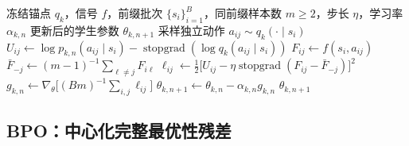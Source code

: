 \documentclass[lang=cn,scheme=chinese,openany]{elegantbook}
\newcommand{\sg}{\operatorname{stopgrad}}
\begin{document}
\begin{algorithm}[ht]
\caption{PMD-Mean 内层更新\\{\small\textit{数学语义：中心化奖励目标在概率归一化约束集上的投影}}}
\begin{algorithmic}[1]
\Require 冻结锚点 $q_k$，信号 $f$，前缀批次 $\{s_i\}_{i=1}^{B}$，同前缀样本数 $m\ge2$，步长 $\eta$，学习率 $\alpha_{k,n}$
\Ensure 更新后的学生参数 $\theta_{k,n+1}$
        \State 采样独立动作 $a_{ij}\sim q_k(\cdot\mid s_i)$
        \State $U_{ij}\gets\log p_{k,n}(a_{ij}\mid s_i)-\sg(\log q_k(a_{ij}\mid s_i))$
        \State $F_{ij}\gets f(s_i,a_{ij})$
    \EndFor
        \State $\bar F_{-j}\gets(m-1)^{-1}\sum_{\ell\ne j}F_{i\ell}$
        \State $\ell_{ij}\gets\frac12\bigl[U_{ij}-\eta\sg(F_{ij}-\bar F_{-j})\bigr]^2$
    \EndFor
\EndFor
\State $g_{k,n}\gets\nabla_\theta\bigl[(Bm)^{-1}\sum_{i,j}\ell_{ij}\bigr]$
\State $\theta_{k,n+1}\gets\theta_{k,n}-\alpha_{k,n}g_{k,n}$
\State \Return $\theta_{k,n+1}$
\end{algorithmic}
\end{algorithm}

\subsection{BPO：中心化完整最优性残差}
\label{subsec:ch2-bpo-loss-derivation}
\label{sec:ch2-bpo}
\end{document}
